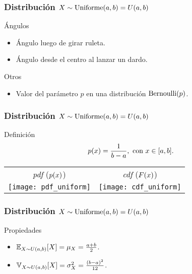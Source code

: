 \documentclass[table]{beamer}
\begin{document}
\begin{frame}
    \frametitle{Distribución $X \sim \text{Uniforme} \parens{a, b} = \uniform{a}{b}$}
    \begin{block}{Ángulos}
        \begin{itemize}
            \item Ángulo luego de girar ruleta.
            \item Ángulo desde el centro al lanzar un dardo.
        \end{itemize}
    \end{block}
    \begin{block}{Otros}
        \begin{itemize}
            \item Valor del parámetro $p$ en una distribución $\bernoulli{p}$.
        \end{itemize}
    \end{block}
\end{frame}

\begin{frame}
    \frametitle{Distribución $X \sim \text{Uniforme} \parens{a, b} = \uniform{a}{b}$}
    \begin{block}{Definición}
        \begin{equation*}
            \pdf{x} = \frac{1}{b - a} , \text{ con } x \in \sparens{a, b} .
        \end{equation*}
    \end{block}
    \begin{center}
        \begin{tabular}{cc}
            \emph{pdf} ($\pdf{x}$) & \emph{cdf} ($\FF{x}$) \\
            \texttt{[image: pdf\_uniform]} &
            \texttt{[image: cdf\_uniform]}
        \end{tabular}
    \end{center}
 \end{frame}




\begin{frame}
    \frametitle{Distribución $X \sim \text{Uniforme} \parens{a, b} = \uniform{a}{b}$}
    \begin{block}{Propiedades}
        \begin{itemize}
            \item $\expecteddist{X \sim \uniform{a}{b}}{X} = \mu_{X} = \frac{a + b}{2}$.
            \item $\variancedist{X \sim \uniform{a}{b}}{X} = \sigma^{2}_{X} = \frac{\parens{b - a}^{2}}{12}$.
        \end{itemize}
    \end{block}
\end{frame}
\end{document}
